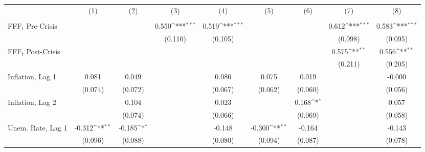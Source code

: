 \documentclass{article}
\begin{document}
{
\def\sym#1{\ifmmode^{#1}\else\(^{#1}\)\fi}
\begin{tabular}{l*{8}{c}}
\hline\hline
                &\multicolumn{1}{c}{(1)}&\multicolumn{1}{c}{(2)}&\multicolumn{1}{c}{(3)}&\multicolumn{1}{c}{(4)}&\multicolumn{1}{c}{(5)}&\multicolumn{1}{c}{(6)}&\multicolumn{1}{c}{(7)}&\multicolumn{1}{c}{(8)}\\
                &\multicolumn{1}{c}{}&\multicolumn{1}{c}{}&\multicolumn{1}{c}{}&\multicolumn{1}{c}{}&\multicolumn{1}{c}{}&\multicolumn{1}{c}{}&\multicolumn{1}{c}{}&\multicolumn{1}{c}{}\\
\hline
FFF$_{t}$ Pre-Crisis&                  &                  &    0.550\sym{***}&    0.519\sym{***}&                  &                  &    0.612\sym{***}&    0.583\sym{***}\\
                &                  &                  &  (0.110)         &  (0.105)         &                  &                  &  (0.098)         &  (0.095)         \\
FFF$_{t}$ Post-Crisis&                  &                  &                  &                  &                  &                  &    0.575\sym{**} &    0.556\sym{**} \\
                &                  &                  &                  &                  &                  &                  &  (0.211)         &  (0.205)         \\
Inflation, Lag 1&    0.081         &    0.049         &                  &    0.080         &    0.075         &    0.019         &                  &   -0.000         \\
                &  (0.074)         &  (0.072)         &                  &  (0.067)         &  (0.062)         &  (0.060)         &                  &  (0.056)         \\
Inflation, Lag 2&                  &    0.104         &                  &    0.023         &                  &    0.168\sym{*}  &                  &    0.057         \\
                &                  &  (0.074)         &                  &  (0.066)         &                  &  (0.069)         &                  &  (0.058)         \\
Unem. Rate, Lag 1&   -0.312\sym{**} &   -0.185\sym{*}  &                  &   -0.148         &   -0.300\sym{**} &   -0.164         &                  &   -0.143         \\
                &  (0.096)         &  (0.088)         &                  &  (0.080)         &  (0.094)         &  (0.087)         &                  &  (0.078)         \\

\end{tabular}}
\end{document}
